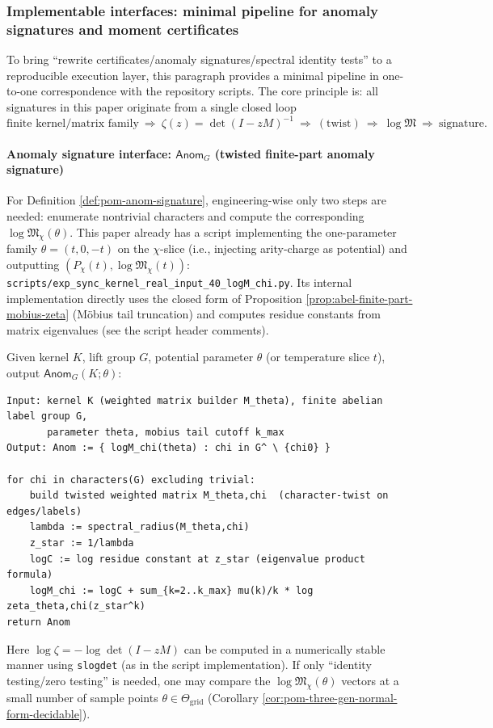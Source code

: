 \subsubsection{Implementable interfaces: minimal pipeline for anomaly signatures and moment certificates}\label{subsec:pom-implementable-interfaces}

To bring ``rewrite certificates/anomaly signatures/spectral identity tests'' to a reproducible execution layer, this paragraph provides a minimal pipeline in one-to-one correspondence with the repository scripts.
The core principle is: all signatures in this paper originate from a single closed loop
$$
\text{finite kernel/matrix family}\ \Longrightarrow\ \zeta(z)=\det(I-zM)^{-1}\ \Longrightarrow\ (\text{twist})\ \Longrightarrow\ \log\mathfrak{M}\ \Longrightarrow\ \text{signature}.
$$

\paragraph{Anomaly signature interface: \texorpdfstring{$\mathsf{Anom}_G$}{Anom} (twisted finite-part anomaly signature)}
For Definition \ref{def:pom-anom-signature}, engineering-wise only two steps are needed: enumerate nontrivial characters and compute the corresponding \(\log\mathfrak{M}_\chi(\theta)\).
This paper already has a script implementing the one-parameter family \(\theta=(t,0,-t)\) on the \(\chi\)-slice (i.e., injecting arity-charge as potential) and outputting \((P_\chi(t),\log\mathfrak{M}_\chi(t))\):
\texttt{scripts/exp\_sync\_kernel\_real\_input\_40\_logM\_chi.py}.
Its internal implementation directly uses the closed form of Proposition \ref{prop:abel-finite-part-mobius-zeta} (M\"obius tail truncation) and computes residue constants from matrix eigenvalues (see the script header comments).

\begin{remark}\label{rem:pom-anom-pseudocode}
Given kernel \(K\), lift group \(G\), potential parameter \(\theta\) (or temperature slice \(t\)), output \(\mathsf{Anom}_G(K;\theta)\):
\begin{verbatim}
Input: kernel K (weighted matrix builder M_theta), finite abelian label group G,
       parameter theta, mobius tail cutoff k_max
Output: Anom := { logM_chi(theta) : chi in G^ \ {chi0} }

for chi in characters(G) excluding trivial:
    build twisted weighted matrix M_theta,chi  (character-twist on edges/labels)
    lambda := spectral_radius(M_theta,chi)
    z_star := 1/lambda
    logC := log residue constant at z_star (eigenvalue product formula)
    logM_chi := logC + sum_{k=2..k_max} mu(k)/k * log zeta_theta,chi(z_star^k)
return Anom
\end{verbatim}
Here \(\log\zeta=-\log\det(I-zM)\) can be computed in a numerically stable manner using \texttt{slogdet} (as in the script implementation).
If only ``identity testing/zero testing'' is needed, one may compare the \(\log\mathfrak{M}_\chi(\theta)\) vectors at a small number of sample points \(\theta\in\Theta_{\mathrm{grid}}\) (Corollary \ref{cor:pom-three-gen-normal-form-decidable}).
\end{remark}

